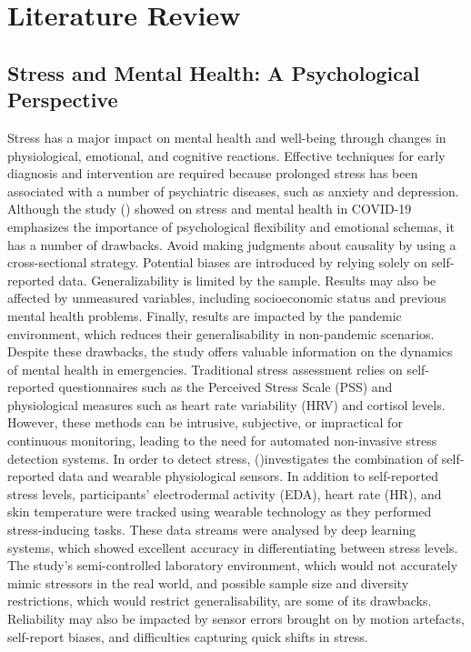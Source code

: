 \documentclass[Arial,12pt,openright,twoside]{book}
\begin{document}
\chapter{Literature Review}
\clearpage 
  \section{Stress and Mental Health: A Psychological Perspective}
  Stress has a major impact on mental health and well-being through changes in physiological, emotional, and cognitive reactions. Effective techniques for early diagnosis and intervention are required because prolonged stress has been associated with a number of psychiatric diseases, such as anxiety and depression. Although the study (\citet{sebastiao2024}) showed on stress and mental health in COVID-19 emphasizes the importance of psychological flexibility and emotional schemas, it has a number of drawbacks. Avoid making judgments about causality by using a cross-sectional strategy. Potential biases are introduced by relying solely on self-reported data. Generalizability is limited by the sample. Results may also be affected by unmeasured variables, including socioeconomic status and previous mental health problems. Finally, results are impacted by the pandemic environment, which reduces their generalisability in non-pandemic scenarios. Despite these drawbacks, the study offers valuable information on the dynamics of mental health in emergencies. Traditional stress assessment relies on self-reported questionnaires such as the Perceived Stress Scale (PSS) and physiological measures such as heart rate variability (HRV) and cortisol levels. However, these methods can be intrusive, subjective, or impractical for continuous monitoring, leading to the need for automated non-invasive stress detection systems.
  In order to detect stress, (\citet{aristizabal2021})investigates the combination of self-reported data and wearable physiological sensors. In addition to self-reported stress levels, participants' electrodermal activity (EDA), heart rate (HR), and skin temperature were tracked using wearable technology as they performed stress-inducing tasks. These data streams were analysed by deep learning systems, which showed excellent accuracy in differentiating between stress levels. The study's semi-controlled laboratory environment, which would not accurately mimic stressors in the real world, and possible sample size and diversity restrictions, which would restrict generalisability, are some of its drawbacks. Reliability may also be impacted by sensor errors brought on by motion artefacts, self-report biases, and difficulties capturing quick shifts in stress.
\end{document}
